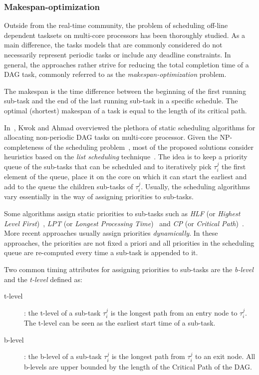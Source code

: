 \documentclass[main.tex]{subfiles}
\begin{document}
\subsubsection{Makespan-optimization}
Outside from the real-time community, the problem of scheduling off-line dependent tasksets on multi-core processors has been thoroughly studied. As a main difference, the tasks models that are commonly considered do not necessarily represent periodic tasks or include any deadline constraints. In general, the approaches rather strive for reducing the total completion time of a DAG task, commonly referred to as the \emph{makespan-optimization} problem.

\begin{definition}[Makespan]
    The makespan is the time difference between the beginning of the first running sub-task and the end of the last running sub-task in a specific schedule. The optimal (shortest) makespan of a task is equal to the length of its critical path.
\end{definition}

In~\cite{Kwok1999}, Kwok and Ahmad overviewed the plethora of static scheduling algorithms for allocating non-periodic DAG tasks on multi-core processor. Given the NP-completeness of the scheduling problem~\cite{Garey1979}, most of the proposed solutions consider heuristics based on the \emph{list scheduling} technique~\cite{Adam1974,Ahmad1996,Casavant1988,ElRewini1994,Gerasoulis1992,Shirazi1990,McCreary1994,Yang1988,Coffman1976}. The idea is to keep a priority queue of the sub-tasks that can be scheduled and to iteratively pick $\tau_i^j$ the first element of the queue, place it on the core on which it can start the earliest and add to the queue the children sub-tasks of $\tau_i^j$. Usually, the scheduling algorithms vary essentially in the way of assigning priorities to sub-tasks. 


Some algorithms assign static priorities to sub-tasks such as \emph{HLF} (or \emph{Highest Level First})~\cite{Coffman1976}, \emph{LPT} (or \emph{Longest Processing Time})~\cite{Friesen1987} and \emph{CP} (or \emph{Critical Path})~\cite{graham1979}. More recent approaches usually assign priorities \emph{dynamically}. In these approaches, the priorities are not fixed a priori and all priorities in the scheduling queue are re-computed every time a sub-task is appended to it.  

Two common timing attributes for assigning priorities to sub-tasks are the \emph{b-level} and the \emph{t-level} defined as:
\begin{description}
    \item[t-level] : the t-level of a sub-task $\tau_i^j$ is the longest path from an entry node to $\tau_i^j$. The t-level can be seen as the earliest start time of a sub-task.
    \item[b-level] : the b-level of a sub-task $\tau_i^j$ is the longest path from $\tau_i^j$ to an exit node. All b-levels are upper bounded by the length of the Critical Path of the DAG.
\end{description}
\end{document}
